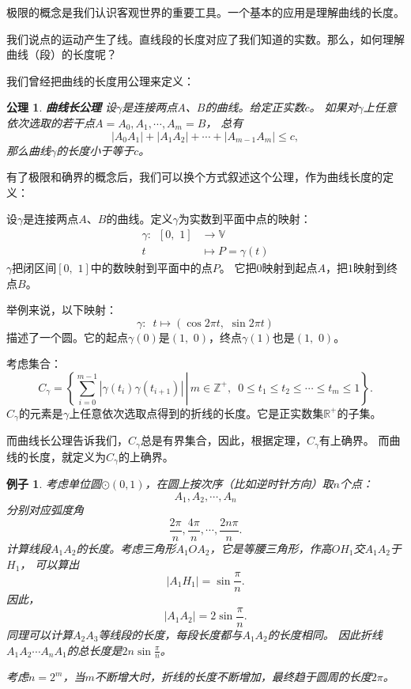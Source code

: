 \documentclass[12pt,UTF8]{ctexbook}
\newtheorem{ex}{例子}[section]
\newtheorem*{po}{公理}
\begin{document}
极限的概念是我们认识客观世界的重要工具。一个基本的应用是理解曲线的长度。

我们说点的运动产生了线。直线段的长度对应了我们知道的实数。那么，如何理解曲线（段）的长度呢？

我们曾经把曲线的长度用公理来定义：

\begin{po}{\textbf{曲线长公理}}
    设$\gamma$是连接两点$A$、$B$的曲线。给定正实数$c$。
    如果对$\gamma$上任意依次选取的若干点$A = A_0, A_1, \cdots , A_m = B$，
    总有
    $$ |A_0A_1| + |A_1A_2| + \cdots + |A_{m-1}A_m| \leqslant c,$$
    那么曲线$\gamma$的长度小于等于$c$。
\end{po}

有了极限和确界的概念后，我们可以换个方式叙述这个公理，作为曲线长度的定义：

设$\gamma$是连接两点$A$、$B$的曲线。定义$\gamma$为实数到平面中点的映射：
\begin{align*}
    \gamma : \,\,\, [0,\,\,1] &\longrightarrow \mathbb{V}  \\
    t &\longmapsto P = \gamma(t)
\end{align*}
$\gamma$把闭区间$[0,\,\,1]$中的数映射到平面中的点$P$。
它把$0$映射到起点$A$，把$1$映射到终点$B$。

举例来说，以下映射：
$$ \gamma : \,\,\, t \mapsto (\cos{2\pi t}, \,\, \sin{2\pi t})$$
描述了一个圆。它的起点$\gamma(0)$是$(1,\,\,0)$，终点$\gamma(1)$也是$(1,\,\,0)$。

考虑集合：
$$ C_\gamma = \left\{\left. \sum_{i=0}^{m-1} |\gamma(t_i)\gamma(t_{i+1})|\, \right| \, m\in\mathbb{Z}^+,\,\,\, 0\leqslant t_1 \leqslant t_2 \leqslant \cdots \leqslant t_m\leqslant 1 \right\}.$$
$C_\gamma$的元素是$\gamma$上任意依次选取点得到的折线的长度。它是正实数集$\mathbb{R}^+$的子集。

而曲线长公理告诉我们，$C_\gamma$总是有界集合，因此，根据定理\label{tm:2-2-10}，$C_\gamma$有上确界。
而曲线的长度，就定义为$C_\gamma$的上确界。

\begin{ex}
    考虑单位圆$\odot(0, 1)$，在圆上按次序（比如逆时针方向）取$n$个点：
    $$ A_1, A_2, \cdots , A_n $$
    分别对应弧度角
    $$\frac{2\pi}{n}, \frac{4\pi}{n}, \cdots , \frac{2n\pi}{n}.$$
    计算线段$A_1A_2$的长度。考虑三角形$A_1OA_2$，它是等腰三角形，作高$OH_1$交$A_1A_2$于$H_1$，
    可以算出
    $$ |A_1H_1| = \sin{\frac{\pi}{n}}.$$
    因此，
    $$ |A_1A_2| = 2\sin{\frac{\pi}{n}}.$$
    同理可以计算$A_2A_3$等线段的长度，每段长度都与$A_1A_2$的长度相同。
    因此折线$A_1A_2\cdots A_nA_1$的总长度是$2n\sin{\frac{\pi}{n}}$。

    考虑$n=2^m$，当$m$不断增大时，折线的长度不断增加，最终趋于圆周的长度$2\pi$。
\end{ex}
\end{document}
